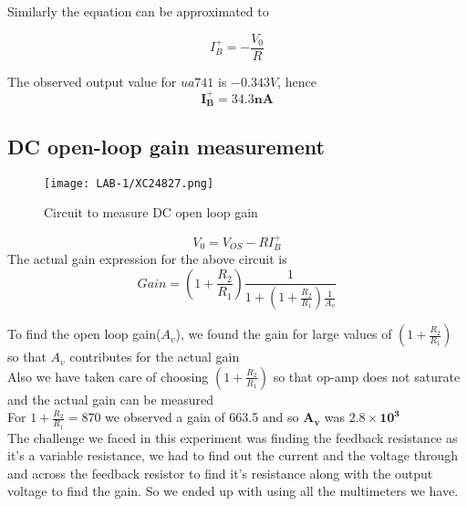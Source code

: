 \documentclass[12pt]{article}
\begin{document}
        Similarly the equation can be approximated to 
        
        \begin{equation}
            I^+_B = -\frac{V_0}{R}
        \end{equation}
        
        The observed output value for $ua 741$ is  $-0.343V$, hence \begin{equation}
            \boxed{\mathbf{I^+_B = 34.3nA}}
        \end{equation}
      
      \subsection{DC open-loop gain measurement}
      
        \begin{figure}[H]
            \centering
            \texttt{[image: LAB-1/XC24827.png]}
            \caption{Circuit to measure DC open loop gain}
        \end{figure}
        \begin{equation}
            V_0 = V_{OS} - RI^+_B
        \end{equation}
      The actual gain expression for the above circuit is
      \begin{equation}
          Gain = \left(1 + \frac{R_2}{R_1}\right)\frac{1}{1 + \left(1 + \frac{R_2}{R_1}\right)\frac{1}{A_v}} 
      \end{equation}
      
      To find the open loop gain($A_v$), we found the gain for large values of $\left(1 + \frac{R_2}{R_1}\right)$ so that $A_v$ contributes for the actual gain \\
      Also we have taken care of choosing $\left(1 + \frac{R_2}{R_1}\right)$ so that op-amp does not saturate and the actual gain can be measured \\
      
      For $1 + \frac{R_2}{R_1} = 870$ we observed a gain of 663.5 and so $\mathbf{A_v}$ was $\mathbf{2.8\times10^3}$    \\
      
      The challenge we faced in this experiment was finding the feedback resistance as it's a variable resistance, we had to find out the current and the voltage through and across the feedback resistor to find it's resistance along with the output voltage to find the gain. So we ended up with using all the multimeters we have.\\
      
\end{document}
